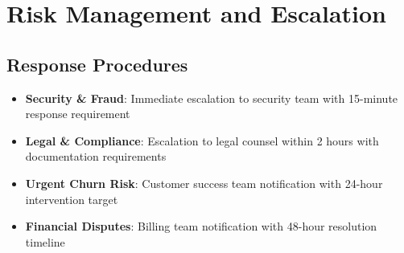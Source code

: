 \documentclass[11pt]{article}
\begin{document}
\section{Risk Management and Escalation}

\subsection{Response Procedures}
\begin{itemize}
\item \textbf{Security \& Fraud}: Immediate escalation to security team with 15-minute response requirement
\item \textbf{Legal \& Compliance}: Escalation to legal counsel within 2 hours with documentation requirements
\item \textbf{Urgent Churn Risk}: Customer success team notification with 24-hour intervention target
\item \textbf{Financial Disputes}: Billing team notification with 48-hour resolution timeline
\end{itemize}
\end{document}
